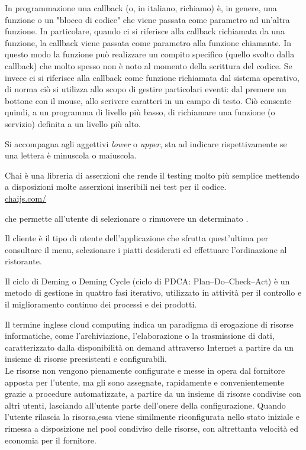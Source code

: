 In programmazione una callback (o, in italiano, richiamo) è, in genere, una funzione o un "blocco di codice" che viene passata come parametro ad un'altra funzione. 
In particolare, quando ci si riferisce alla callback richiamata da una funzione, la callback viene passata come parametro alla funzione chiamante. In questo modo la funzione può realizzare un compito specifico (quello svolto dalla callback) che molto spesso non è noto al momento della scrittura del codice. Se invece ci si riferisce alla callback come funzione richiamata dal sistema operativo, di norma ciò si utilizza allo scopo di gestire particolari eventi: dal premere un bottone con il mouse, allo scrivere caratteri in un campo di testo. Ciò consente quindi, a un programma di livello più basso, di richiamare una funzione (o servizio) definita a un livello più alto.

Si accompagna agli aggettivi \textit{lower} o \textit{upper}, sta ad indicare rispettivamente se una lettera è minuscola o maiuscola.


Chai è una libreria  di asserzioni che rende il testing molto più semplice mettendo a disposizioni molte asserzioni inseribili nei test per il codice.\\
\url{chaijs.com/}

 che permette all’utente di selezionare o rimuovere un determinato .

Il cliente è il tipo di utente dell’applicazione che sfrutta quest’ultima per consultare il menu, selezionare i piatti desiderati ed effettuare l’ordinazione al ristorante.

Il ciclo di Deming o Deming Cycle (ciclo di PDCA: Plan–Do–Check–Act) è un metodo di gestione in quattro fasi iterativo, utilizzato in attività per il controllo e il miglioramento continuo dei processi e dei prodotti.

Il termine inglese cloud computing indica un paradigma di erogazione di risorse informatiche, come l'archiviazione, l'elaborazione o la trasmissione di dati, caratterizzato dalla disponibilità on demand attraverso Internet a partire da un insieme di risorse preesistenti e configurabili.\\
Le risorse non vengono pienamente configurate e messe in opera dal fornitore apposta per l'utente, ma gli sono assegnate, rapidamente e convenientemente grazie a procedure automatizzate, a partire da un insieme di risorse condivise con altri utenti, lasciando all'utente parte dell'onere della configurazione. Quando l'utente rilascia la risorsa,essa viene similmente riconfigurata nello stato iniziale e rimessa a disposizione nel pool condiviso delle risorse, con altrettanta velocità ed economia per il fornitore.

